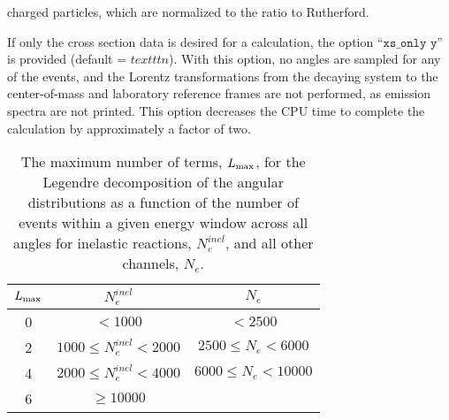 \documentclass[
10pt,
showpacs,preprintnumbers,footinbib,
amsfonts,amsmath,amssymb,
aps,
prc,twocolumn,groupedaddress,superscriptaddress,
showkeys,
nofootinbib
]{revtex4-1}
\begin{document}
charged particles, which are normalized to the ratio to Rutherford. 

If only the cross section data is desired for a calculation, the option ``${\texttt{xs\_only y}}$'' is provided (default = ${texttt{n}}$). With this option, no angles are sampled for any of the events, and the Lorentz transformations from the decaying system to the center-of-mass and laboratory reference frames are not performed, as emission spectra are not printed. This option decreases the CPU time to complete the calculation by approximately a factor of two.

\begin{table}
\caption{The maximum number of terms, $L_{\rm max}$, for the Legendre decomposition of the angular distributions as a function of the number of events within a given energy window across all angles for inelastic reactions, $N_e^{inel}$, and all other channels, $N_e$.}
\begin{center}
\begin{tabular}{| c | c | c |}
\hline
$L_{\rm max}$ & $N_e^{inel}$ & $N_e$ \\
\hline
0 & $< 1000$ & $< 2500$\\
2 & $1000 \le N_e^{inel} < 2000$ & $2500 \le N_e < 6000$\\
4 & $2000 \le N_e^{inel} < 4000$ & $6000 \le N_e < 10000$\\
6 & $\ge 10000$\\
\hline
\end{tabular}
\label{tab:L_max}
\end{center}
\end{table}
\end{document}

